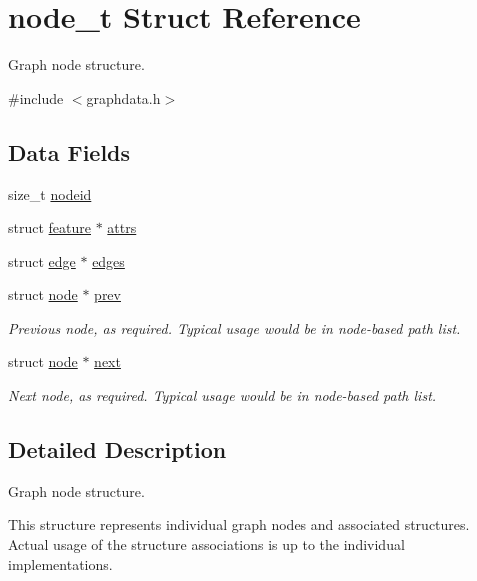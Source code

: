 \hypertarget{structnode__t}{}\section{node\+\_\+t Struct Reference}
\label{structnode__t}


Graph node structure.  




{\ttfamily \#include $<$graphdata.\+h$>$}

\subsection*{Data Fields}
\begin{DoxyCompactItemize}
\item 
size\+\_\+t \hyperlink{structnode__t_a3fe17f2fd1e7a7b2ec5f7bfae826816c}{nodeid}
\item 
struct \hyperlink{graphdata_8h_a068417678f021a74e911edd39f8d0bce}{feature} $\ast$ \hyperlink{structnode__t_afa07214493711b8865247610bc4b5bdf}{attrs}
\item 
struct \hyperlink{graphdata_8h_a641a8a4cd064e02a13e6c15d1b2df541}{edge} $\ast$ \hyperlink{structnode__t_a5134fc88690d419dd465e34c9f7a69bb}{edges}
\item 
struct \hyperlink{graphdata_8h_a85b4f4124a5616dea92c9e8a221a8db5}{node} $\ast$ \hyperlink{structnode__t_a19f92ca38ac9aac34b076878b629398d}{prev}
\begin{DoxyCompactList}\small\item\em Previous node, as required. Typical usage would be in node-\/based path list. \end{DoxyCompactList}\item 
struct \hyperlink{graphdata_8h_a85b4f4124a5616dea92c9e8a221a8db5}{node} $\ast$ \hyperlink{structnode__t_a984d83b78d25abe09e7c4c953ef9d1ad}{next}
\begin{DoxyCompactList}\small\item\em Next node, as required. Typical usage would be in node-\/based path list. \end{DoxyCompactList}\end{DoxyCompactItemize}


\subsection{Detailed Description}
Graph node structure. 

This structure represents individual graph nodes and associated structures. Actual usage of the structure associations is up to the individual implementations. 

